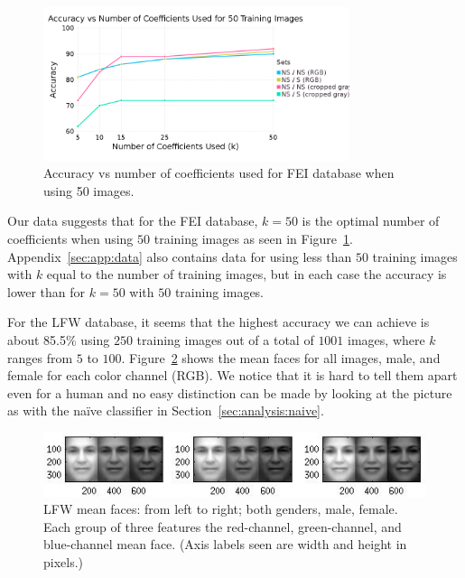 \documentclass[hidelinks,11pt]{article}
\begin{document}
\begin{figure}[!ht]
  \centering
  \includegraphics[width=0.8\textwidth]{accuracy_k.png}
  \caption{Accuracy vs number of coefficients used for FEI database when using
  50 images.}
  \label{fig:analysis:lda:accuracy_fei}
\end{figure}

Our data suggests that for the FEI database, $k = 50$ is the optimal number of
coefficients when using $50$ training images as seen in
Figure~\ref{fig:analysis:lda:accuracy_fei}. Appendix~\ref{sec:app:data} also
contains data for using less than $50$ training images with $k$ equal to the
number of training images, but in each case the accuracy is lower than for $k =
50$ with $50$ training images.

For the LFW database, it seems that the highest accuracy we can achieve is about
85.5\% using $250$ training images out of a total of $1001$ images, where $k$
ranges from $5$ to $100$. Figure~\ref{fig:analysis:lda:mean} shows the mean
faces for all images, male, and female for each color channel (RGB). We notice
that it is hard to tell them apart even for a human and no easy distinction can
be made by looking at the picture as with the na\"ive classifier in
Section~\ref{sec:analysis:naive}. 

\begin{figure}[!ht]
  \centering
  \includegraphics{avg.jpg}
  \caption{LFW mean faces: from left to right; both genders, male, female. Each
  group of three features the red-channel, green-channel, and blue-channel mean
  face. (Axis labels seen are width and height in pixels.)}
  \label{fig:analysis:lda:mean}
\end{figure}
\end{document}
